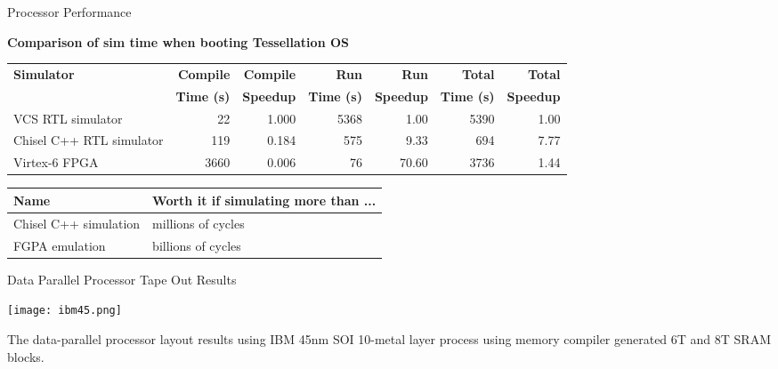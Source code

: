 \documentclass[xcolor=pdflatex,dvipsnames,table]{beamer}
\begin{document}
\begin{frame}[fragile]{Processor Performance}

\textbf{Comparison of sim time when booting Tessellation OS}
\vskip0.5cm

\begin{tiny}
\begin{tabular}{lrrrrrr}
\textbf{Simulator} & \textbf{Compile}  & \textbf{Compile} & \textbf{Run}  & \textbf{Run} & \textbf{Total} & \textbf{Total} \\
& \textbf{Time (s)}  & \textbf{Speedup} & \textbf{Time (s)}  & \textbf{Speedup} & \textbf{Time (s)} & \textbf{Speedup} \\
\hline
VCS RTL simulator             &   22 & 1.000 & 5368 & 1.00 & 5390 & 1.00 \\ 
Chisel C++ RTL simulator & 119 & 0.184 & 575 & 9.33 & 694 & 7.77\\
Virtex-6 FPGA & 3660 & 0.006 & 76 & 70.60 & 3736 & 1.44\\
\end{tabular}
\end{tiny}

\vskip1cm

\begin{tabular}{ll}
\textbf{Name} & \textbf{Worth it if simulating more than ...} \\
\hline
Chisel C++ simulation & millions of cycles \\
FGPA emulation & billions of cycles \\
\end{tabular}

\end{frame}

\begin{frame}[fragile]{Data Parallel Processor Tape Out Results}

\begin{center}
\texttt{[image: ibm45.png]}

\begin{footnotesize}
The data-parallel processor layout results using IBM 45nm SOI 10-metal layer process using memory compiler generated 6T and 8T SRAM blocks.
\end{footnotesize}
\end{center}

\end{frame}
\end{document}

